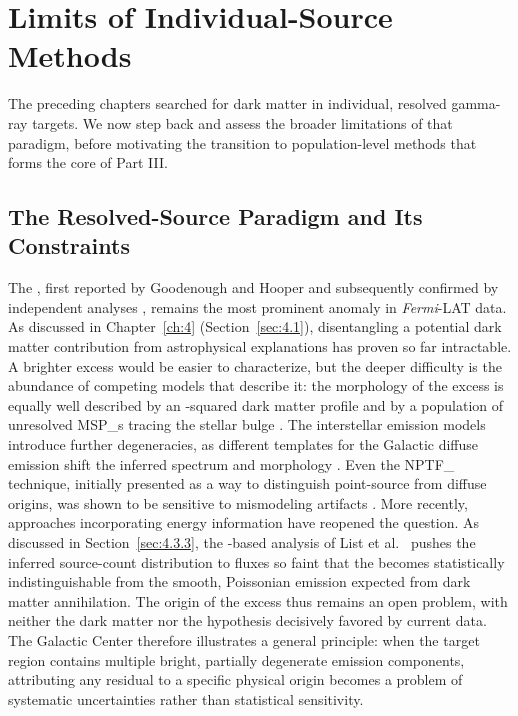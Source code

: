 \section{Limits of Individual-Source Methods}
\label{sec:limits_individual}

The preceding chapters searched for dark matter in individual, resolved gamma-ray targets.
We now step back and assess the broader limitations of that paradigm, before motivating the transition to population-level methods that forms the core of Part III.

\subsection{The Resolved-Source Paradigm and Its Constraints}
\label{sec:6.1.1}

The \GCE, first reported by Goodenough and Hooper \cite{Goodenough:2009gk} and subsequently confirmed by independent analyses \cite{Hooper:2010mq,Daylan:2014rsa,Calore:2014xka}, remains the most prominent anomaly in \textit{Fermi}-LAT data. As discussed in Chapter~\ref{ch:4} (Section~\ref{sec:4.1}), disentangling a potential dark matter contribution from astrophysical explanations has proven so far intractable.
A brighter excess would be easier to characterize, but the deeper difficulty is the abundance of competing models that describe it: the morphology of the excess is equally well described by an \NFW-squared dark matter profile and by a population of unresolved \glspl{MSP_} tracing the stellar bulge \cite{Bartels:2015aea,Lee:2015fea}. The interstellar emission models introduce further degeneracies, as different templates for the Galactic diffuse emission shift the inferred \GCE spectrum and morphology \cite{Calore:2014xka}. Even the \gls{NPTF_} technique, initially presented as a way to distinguish point-source from diffuse origins, was shown to be sensitive to mismodeling artifacts \cite{Leane:2019xiy,Leane:2020nmi}.
More recently, \SBI approaches incorporating energy information have reopened the question.
As discussed in Section~\ref{sec:4.3.3}, the \CNN-based analysis of List et al.~\cite{List:2025qbx} pushes the inferred source-count distribution to fluxes so faint that the \GCE becomes statistically indistinguishable from the smooth, Poissonian emission expected from dark matter annihilation.
The origin of the excess thus remains an open problem, with neither the dark matter nor the \MSP hypothesis decisively favored by current data.
The Galactic Center therefore illustrates a general principle: when the target region contains multiple bright, partially degenerate emission components, attributing any residual to a specific physical origin becomes a problem of systematic uncertainties rather than statistical sensitivity.

